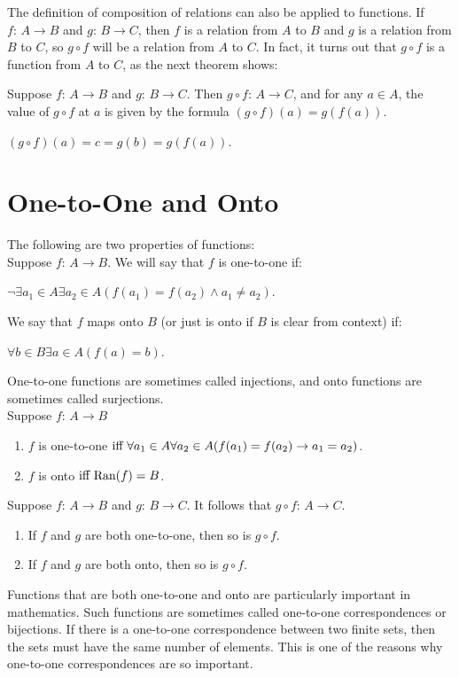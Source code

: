 \documentclass{article}
\begin{document}
\noindent The definition of \gls{composition} of relations can also be applied to functions. If $f \text{: } A \to B$ and $g \text{: } B \to C$, then $f$ is a relation from $A$ to $B$ and $g$ is a relation from $B$ to $C$, so $g \circ f$ will be a relation from $A$ to $C$. In fact, it turns out that $g \circ f$ is a function from $A$ to $C$, as the next theorem shows:
\begin{center}
Suppose $f \text{: } A \to B$ and $g \text{: } B \to C$. Then $g \circ f \text{: } A \to C$, and for any $a \in A$, the value of $g \circ f$ at $a$ is given by the formula $(g \circ f)(a) = g(f(a))$.
\end{center}
$(g \circ f)(a) = c = g(b) = g(f(a))$.

\section{One-to-One and Onto}
The following are two properties of functions:\\

\noindent Suppose $f \text{: } A \to B$. We will say that $f$ is \gls{one-to-one} if:
\begin{center}
    $\lnot \exists a_{1} \in A \exists a_{2} \in A(f(a_{1}) = f(a_{2}) \land a_{1} \neq a_{2})$.
\end{center}
We say that $f$ maps \gls{onto} $B$ (or just is onto if $B$ is clear from context) if:
\begin{center}
    $\forall b \in B \exists a \in A(f(a) = b)$.
\end{center}
One-to-one functions are sometimes called \glspl{injection}, and onto functions are sometimes called \glspl{surjection}.\\

\noindent Suppose $f \text{: } A \to B$
\begin{enumerate}
    \item $f$ is one-to-one$\text{ iff } \forall a_{1} \in A \forall a_{2} \in A(f(a_{1}) = f(a_{2}) \rightarrow a_{1} = a_{2})$.
    \item $f$ is onto$\text{ iff } \text{Ran}(f) = B$.
\end{enumerate}

\noindent Suppose $f \text{: } A \to B$ and $g \text{: } B \to C$. It follows that $g \circ f \text{: } A \to C$.
\begin{enumerate}
    \item If $f$ and $g$ are both one-to-one, then so is $g \circ f$.
    \item If $f$ and $g$ are both onto, then so is $g \circ f$.
\end{enumerate}
Functions that are both one-to-one and onto are particularly important in mathematics. Such functions are sometimes called \glspl{one-to-one correspondence} or \glspl{bijection}. If there is a one-to-one correspondence between two finite sets, then the sets must have the same number of elements. This is one of the reasons why one-to-one correspondences are so important. 
\end{document}
